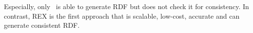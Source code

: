 Especially, only~\cite{conf/aaaiss/ParundekarKA10} is able to generate \ac{RDF} but does not check it for consistency.
In contrast, REX is the first approach that is scalable, low-cost, accurate and can generate consistent \ac{RDF}. 
%
%
%
%


